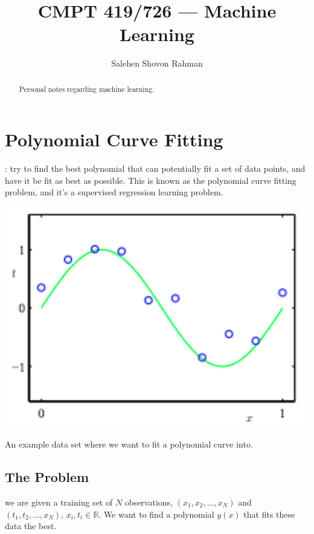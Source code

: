 \documentclass{tufte-handout}
\title{CMPT 419/726 --- Machine Learning}
\author[Salehen Shovon Rahman]{Salehen Shovon Rahman}
\begin{document}
\maketitle%

\begin{abstract}
\noindent
Personal notes regarding machine learning.
\end{abstract}


\section{Polynomial Curve Fitting}\label{sec:polynomial-curve-fitting}

: try to find the best
polynomial that can potentially fit a set of data points, and have it be fit as
best as possible. This is known as the polynomial curve fitting problem, and
it's a supervised regression learning problem.

\begin{marginfigure}
  \includegraphics[width=\linewidth]{curvefitting.png}
  \caption{An example data set where we want to fit a polynomial curve into.}
\end{marginfigure}

\subsection{The Problem}\label{sec:headings}

 we are given a training set of $N$ observations, $(x_{1},
x_{2}, \ldots, x_{N})$ and $(t_{1}, t_{2}, \ldots, x_{N})$, $x_{i}, t_{i} \in
\mathbb{R}$. We want to find a polynomial $y(x)$ that fits these data the best.
\end{document}
